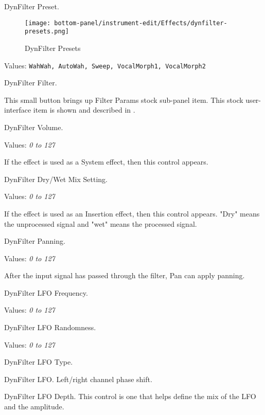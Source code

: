    \setcounter{ItemCounter}{0}      %

   DynFilter Preset.

\begin{figure}[H]
   \centering 
   \texttt{[image: bottom-panel/instrument-edit/Effects/dynfilter-presets.png]}
   \caption{DynFilter Presets}
   \label{fig:effects_dynfilter_presets}
\end{figure}

   Values: \texttt{WahWah, AutoWah, Sweep, VocalMorph1, VocalMorph2}

   DynFilter Filter.

   This small button brings up Filter Params stock sub-panel item.
   This stock user-interface item is shown and described in
   .

   DynFilter Volume.

   Values: \textsl{0 to 127}

   If the effect is used as a System effect, then this control appears.

   DynFilter Dry/Wet Mix Setting.

   Values: \textsl{0 to 127}

   If the effect is used as an Insertion effect, then this control appears.
   "Dry" means the unprocessed signal and "wet" means the processed signal. 

   DynFilter Panning.

   Values: \textsl{0 to 127}

   After the input signal has passed through the filter, Pan can apply
   panning.

   DynFilter LFO Frequency.

   Values: \textsl{0 to 127}

   DynFilter LFO Randomness.

   Values: \textsl{0 to 127}

   DynFilter LFO Type.

   DynFilter LFO.
   Left/right channel phase shift.

   DynFilter LFO Depth.
   This control is one that helps define the mix of the LFO and the
   amplitude.

